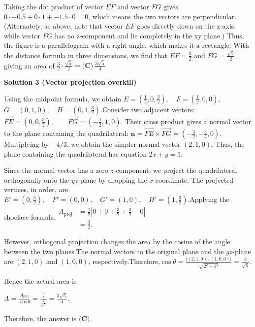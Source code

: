\begin{enumerate}
 Taking the dot product of vector $EF$ and vector $FG$ gives $0 \cdot -0.5 + 0 \cdot 1 + -1.5 \cdot 0 = 0$, which means the two vectors are perpendicular.  (Alternately, as above, note that vector $EF$ goes directly down on the z-axis, while vector $FG$ has no z-component and lie completely in the xy plane.)  Thus, the figure is a parallelogram with a right angle, which makes it a rectangle.  With the distance formula in three dimensions, we find that $EF = \frac{3}{2}$ and $FG = \frac{\sqrt{5}}{2}$, giving an area of $\frac32 \cdot \frac{\sqrt{5}}{2} = \boxed{\textbf{(C)}\ \frac{3\sqrt{5}}{4}}$




\textbf{Solution 3 (Vector projection overkill)}

Using the midpoint formula, we obtain $E=\left(\frac12,0,\frac32\right),\quad F=\left(\frac12,0,0\right),$$G=(0,1,0),\quad H=\left(0,1,\frac32\right).$Consider two adjacent vectors:$\overrightarrow{FE}=\left(0,0,\frac32\right),\qquad \overrightarrow{FG}=\left(-\frac12,1,0\right).$ Their cross product gives a normal vector to the plane containing the quadrilateral: $\mathbf n=\overrightarrow{FE}\times\overrightarrow{FG}=\left(-\frac32,-\frac34,0\right).$Multiplying by $-4/3$, we obtain the simpler normal vector $(2,1,0)$. Thus, the plane containing the quadrilateral has equation $2x+y=1.$

 Since the normal vector has a zero $z$-component, we project the quadrilateral orthogonally onto the $yz$-plane by dropping the $x$-coordinate. The projected vertices, in order, are $E'=\left(0,\frac32\right),\quad F'=(0,0),\quad G'=(1,0),\quad H'=\left(1,\frac32\right).$Applying the shoelace formula,$\begin{aligned} A_{\text{proj}} &=\frac12\left| 0+0+\frac32+\frac32-0 \right|\\ &=\frac32. \end{aligned}$

 However, orthogonal projection changes the area by the cosine of the angle between the two planes.The normal vectors to the original plane and the $yz$-plane are $(2,1,0)$ and $(1,0,0)$, respectively.Therefore,$\cos\theta =\frac{|(2,1,0)\cdot(1,0,0)|} {\sqrt{2^2+1^2}} =\frac{2}{\sqrt5}.$

 Hence the actual area is

 $A=\frac{A_{\text{proj}}}{\cos\theta} =\frac{\frac32}{\frac{2}{\sqrt5}} =\boxed{\frac{3\sqrt5}{4}}.$

 Therefore, the answer is $\boxed{\textbf{(C)}}$.


\end{enumerate}
